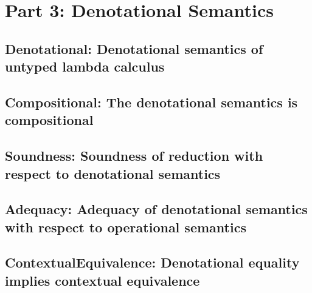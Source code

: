 \documentclass[10pt]{book}
\begin{document}

\part{Part 3: Denotational Semantics}



\hypertarget{denotational}{%
  \chapter{Denotational: Denotational semantics of untyped lambda calculus}\label{denotational}}


\hypertarget{compositional}{%
  \chapter{Compositional: The denotational semantics is compositional}\label{compositional}}


\hypertarget{soundness}{%
  \chapter{Soundness: Soundness of reduction with respect to denotational semantics}\label{soundness}}


\hypertarget{adequacy}{%
  \chapter{Adequacy: Adequacy of denotational semantics with respect to operational semantics}\label{adequacy}}


\hypertarget{contextualequivalence}{%
  \chapter{ContextualEquivalence: Denotational equality implies contextual equivalence}\label{contextualequivalence}}











\appendix
{}
\end{document}
